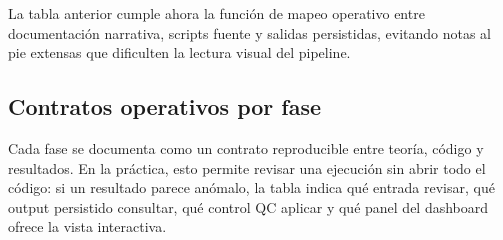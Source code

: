 La tabla anterior cumple ahora la función de mapeo operativo entre documentación narrativa, scripts fuente y salidas persistidas, evitando notas al pie extensas que dificulten la lectura visual del pipeline.

\subsection{Contratos operativos por fase}

Cada fase se documenta como un contrato reproducible entre teoría, código y resultados. En la práctica, esto permite revisar una ejecución sin abrir todo el código: si un resultado parece anómalo, la tabla indica qué entrada revisar, qué output persistido consultar, qué control QC aplicar y qué panel del dashboard ofrece la vista interactiva.

